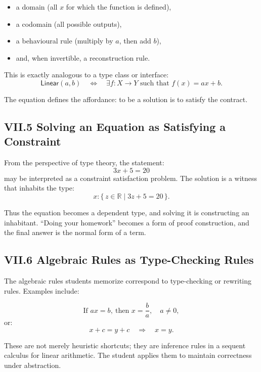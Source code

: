 \documentclass[12pt,letterpaper]{article}
\begin{document}
\begin{itemize}
    \item a domain (all \(x\) for which the function is defined),
    \item a codomain (all possible outputs),
    \item a behavioural rule (multiply by \(a\), then add \(b\)),
    \item and, when invertible, a reconstruction rule.
\end{itemize}

This is exactly analogous to a type class or interface:
\[
\mathsf{Linear}(a,b) \quad \iff \quad \exists f : X \to Y \text{ such that } f(x) = ax + b.
\]

The equation defines the affordance: to be a solution is to satisfy the contract.

\subsection{VII.5 Solving an Equation as Satisfying a Constraint}

From the perspective of type theory, the statement:
\[
3x + 5 = 20
\]
may be interpreted as a constraint satisfaction problem. The solution is a witness that inhabits the type:
\[
x : \{\,z \in \mathbb{R} \mid 3z + 5 = 20\,\}.
\]

Thus the equation becomes a dependent type, and solving it is constructing an inhabitant. ``Doing your homework'' becomes a form of proof construction, and the final answer is the normal form of a term.

\subsection{VII.6 Algebraic Rules as Type-Checking Rules}

The algebraic rules students memorize correspond to type-checking or rewriting rules. Examples include:

\[
\text{If } ax = b,\ \text{then } x = \frac{b}{a}, \quad a \neq 0,
\]
or:
\[
x + c = y + c \quad \Rightarrow \quad x = y.
\]

These are not merely heuristic shortcuts; they are inference rules in a sequent calculus for linear arithmetic. The student applies them to maintain correctness under abstraction.
\end{document}
